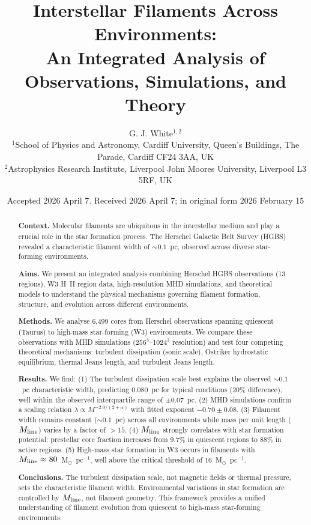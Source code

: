 \documentclass{mnras}
\title{Interstellar Filaments Across Environments:\\
       An Integrated Analysis of Observations, Simulations, and Theory}
\author{G. J. White$^{1,2}$\\
$^{1}$School of Physics and Astronomy, Cardiff University, Queen's Buildings, The Parade, Cardiff CF24 3AA, UK\\
$^{2}$Astrophysics Research Institute, Liverpool John Moores University, Liverpool L3 5RF, UK
}
\date{Accepted 2026 April 7. Received 2026 April 7; in original form 2026 February 15}
\begin{document}
\label{firstpage}
\maketitle

\begin{abstract}
\textbf{Context.} Molecular filaments are ubiquitous in the interstellar medium and play a crucial role in the star formation process. The Herschel Galactic Belt Survey (HGBS) revealed a characteristic filament width of $\sim0.1$~pc, observed across diverse star-forming environments.

\textbf{Aims.} We present an integrated analysis combining Herschel HGBS observations (13 regions), W3 H~II region data, high-resolution MHD simulations, and theoretical models to understand the physical mechanisms governing filament formation, structure, and evolution across different environments.

\textbf{Methods.} We analyse 6,499 cores from Herschel observations spanning quiescent (Taurus) to high-mass star-forming (W3) environments. We compare these observations with MHD simulations (256$^3$--1024$^3$ resolution) and test four competing theoretical mechanisms: turbulent dissipation (sonic scale), Ostriker hydrostatic equilibrium, thermal Jeans length, and turbulent Jeans length.

\textbf{Results.} We find: (1) The turbulent dissipation scale best explains the observed $\sim0.1$~pc characteristic width, predicting 0.080~pc for typical conditions (20\% difference), well within the observed interquartile range of $\pm0.07$~pc. (2) MHD simulations confirm a scaling relation $\lambda \propto M^{-2.0/(2+\alpha)}$ with fitted exponent $-0.70 \pm 0.08$. (3) Filament width remains constant ($\sim0.1$~pc) across all environments while mass per unit length ($M_{\rm line}$) varies by a factor of $>15$. (4) $M_{\rm line}$ strongly correlates with star formation potential: prestellar core fraction increases from $9.7\%$ in quiescent regions to $88\%$ in active regions. (5) High-mass star formation in W3 occurs in filaments with $M_{\rm line} \approx 80$~M$_\odot$~pc$^{-1}$, well above the critical threshold of $16$~M$_\odot$~pc$^{-1}$.

\textbf{Conclusions.} The turbulent dissipation scale, not magnetic fields or thermal pressure, sets the characteristic filament width. Environmental variations in star formation are controlled by $M_{\rm line}$, not filament geometry. This framework provides a unified understanding of filament evolution from quiescent to high-mass star-forming environments.
\end{abstract}
\end{document}

